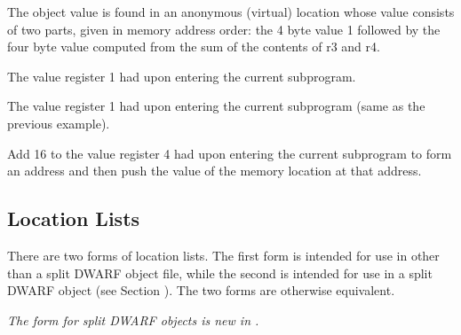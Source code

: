 \begin{description}
\vspace{-2\parsep}
The object value is found in an anonymous (virtual) location whose
value consists of two parts, given in memory address order: the 4 byte
value 1 followed by the four byte value computed from the sum of the
contents of r3 and r4.

\descriptionitemnl{\DWOPentryvalue{} 1 \DWOPregone{} \DWOPstackvalue }
The value register 1 had upon entering the current subprogram.

\descriptionitemnl{\DWOPentryvalue{} 2 \DWOPbregone{} 0 \DWOPstackvalue }
The value register 1 had upon entering the current subprogram (same as the previous example).


\descriptionitemnl{\DWOPentryvalue{} 3 \DWOPbregfour{} 16 \DWOPderef{} \DWOPstackvalue }
Add 16 to the value register 4 had upon entering the current subprogram
to form an address and then push the value of the memory location at that address.

\end{description}


\subsection{Location Lists}
\label{chap:locationlists}
There are two forms of location lists. The first form 
is intended for use in other than a split DWARF object file,
while the second is intended for use in a split DWARF object
(see Section ). The two
forms are otherwise equivalent.

\textit{The form for split DWARF objects is new in \DWARFVersionV.}

